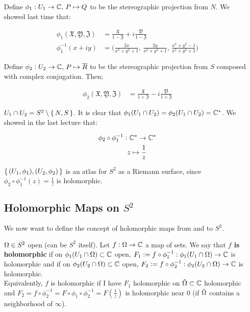 Define $\phi_1:U_1 \to \mathbb{C}, \, P \mapsto Q$ to be the stereographic projection from $N$. We showed last time that:

\begin{align*}
\phi_1 (\mathfrak{X}, \mathfrak{Y}, \mathfrak{Z}) &= \frac{\mathfrak{X}}{1 - \mathfrak{Z}} + i \frac{ \mathfrak{Y}}{1 - \mathfrak{Z}}\\
\phi_1^{-1} (x+iy) &= \bigg( \frac{2x}{x^2+y^2+1} , \,  \frac{2y}{x^2+y^2+1} , \, \frac{x^2+y^2-1}{x^2+y^2+1}  \bigg)
\end{align*}


Define $\phi_2:U_2 \to \mathbb{C}, \, P \mapsto \overline{R}$ to be the stereographic projection from $S$ composed with complex conjugation. Then;

\begin{align*}
\phi_2 (\mathfrak{X}, \mathfrak{Y}, \mathfrak{Z}) &= \frac{\mathfrak{X}}{1 + \mathfrak{Z}} - i \frac{ \mathfrak{Y}}{1 + \mathfrak{Z}}
\end{align*}

$U_1 \cap U_2 = S^2 \setminus \set{N,S}$. It is clear that $\phi_1 (U_1 \cap U_2) = \phi_2(U_1 \cap U_2) = \mathbb{C}^*$. We showed in the last lecture that:

\begin{align*}
    \phi_2 \circ \phi_1^{-1} :& \, \, \mathbb{C}^* \to \mathbb{C}^*\\
    &z \mapsto \frac{1}{z}
\end{align*}

\begin{note}
$\set{ (U_1, \phi_1) , (U_2, \phi_2) }$ is an atlas for $S^2$ as a Riemann surface, since $ \phi_2 \circ \phi_1^{-1} (z) = \frac{1}{z}$ is holomorphic.
\end{note}


\subsection{Holomorphic Maps on $S^2$}
We now want to define the concept of holomorphic maps from and to $S^2$.

\begin{definition}

$\Omega \in S^2$ open (can be $S^2$ itself). Let $f:\Omega \rightarrow \mathbb{C}$ a map of sets. We say that \textbf{$f$ is holomorphic} if on $\phi_1 ( U_1 \cap \Omega) \subset \mathbb{C}$ open, $F_1 \vcentcolon= f \circ \phi_1^{-1} : \phi_1(U_1 \cap \Omega) \to \mathbb{C}$ is holomorphic and if on $\phi_2 ( U_2 \cap \Omega) \subset \mathbb{C}$ open, $F_2 \vcentcolon= f \circ \phi_2^{-1} : \phi_2(U_2 \cap \Omega) \to \mathbb{C}$ is holomorphic.\\

Equivalently, $f$ is holomorphic if I have $F_1$ holomorphic on $\Tilde{\Omega} \subset \mathbb{C}$ holomorphic and $F_2 = f \circ \phi_2^{-1} = F \circ \phi_1 \circ \phi_2^{-1} = F \left( \frac{1}{z} \right)$ is holomorphic near $0$ (if $\Tilde{\Omega}$ contains a neighborhood of $\infty$).
\end{definition}


